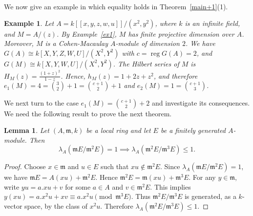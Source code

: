 \documentclass[11pt]{amsart}
\theoremstyle{plain}
\newtheorem{lemma}[theorem]{Lemma}
\newtheorem{example}[theorem]{Example}
\newcommand{\m}{\mathfrak{m}}
\theoremstyle{plain}
\begin{document}
We now give an example in which equality holds in Theorem~\ref{main+1}(1).

\begin{example}
\normalfont
Let $A=k[[x,y,z,w,u]]/(x^2,y^2)$, where $k$ is an infinite field, and $M=A/(z)$. By Example~\ref{ex1}, $M$ has finite projective dimension over $A$. Moreover, $M$ is a Cohen-Macaulay $A$-module of dimension $2$. We have $G(A)\cong k[X,Y,Z,W,U]/(X^2,Y^2)$ with $c=\operatorname{reg} G(A)=2$, and
$G(M)\cong k[X,Y,W,U]/(X^2,Y^2)$. The Hilbert series of $M$ is
$\displaystyle H_M(z)=\frac{(1+z)^2}{1-z}$. Hence, $h_M(z)=1+2z+z^2$, and therefore
$e_1(M)=4=\binom{3}{2}+1=\binom{c+1}{2}+1$ and
$e_2(M)=1=\binom{c+1}{3}$.
\end{example}



We next turn to the case $e_1(M)=\binom{c+1}{2}+2$ and investigate its consequences. We need the following result to prove the next theorem.

\begin{lemma}\label{length}
Let $(A,\m,k)$ be a local ring and let $E$ be a finitely generated $A$-module. Then $$\lambda_A({\m E}/{\m^2 E})=1\implies \lambda_A({\m^2 E}/{\m^{3} E})\leq 1.$$
\end{lemma}

\begin{proof}
Choose $x\in \m$ and $u\in E$ such that
$xu\notin \m^2E$. Since $\lambda_A({\m E}/{\m^2 E})=1$, we have $\m E=A(xu)+\m^2E.$ Hence $\m^2E=\mathfrak m(xu)+\m^3E.$ For any $y\in\m$, write $yu=a.xu+v$ for some $a\in A$ and $v\in\m^2E$. This implies $y(xu)=a.x^2u+xv\equiv a.x^2u \pmod{\m^3E}$. Thus $\m^2E/\m^3E$ is generated, as a $k$-vector space, by the class of $x^2u$. Therefore $\lambda_A({\m^2E}/{\m^3E})\leq 1.$
\end{proof}
\end{document}
